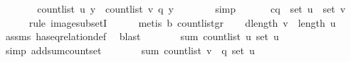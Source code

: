 \begin{isabellebody}
\ \ \ \ \isamarkupfalse%
\ \isamarkupfalse%
\ {\isachardoublequoteopen}count{\isacharunderscore}{\kern0pt}list\ u\ y\ {\isacharequal}{\kern0pt}\ count{\isacharunderscore}{\kern0pt}list\ v\ {\isacharparenleft}{\kern0pt}q\ y{\isacharparenright}{\kern0pt}{\isachardoublequoteclose}\isanewline
\ \ \ \ \ \ \isamarkupfalse%
\ simp\isanewline
\ \ \isamarkupfalse%
\isanewline
\isanewline
\ \ \isamarkupfalse%
\ c{\isacharcolon}{\kern0pt}{\isachardoublequoteopen}q\ {\isacharbackquote}{\kern0pt}\ set\ u\ {\isasymsubseteq}\ set\ v{\isachardoublequoteclose}\ \isanewline
\ \ \ \ \isamarkupfalse%
\ {\isacharparenleft}{\kern0pt}rule\ image{\isacharunderscore}{\kern0pt}subsetI{\isacharparenright}{\kern0pt}\isanewline
\ \ \ \ \isamarkupfalse%
\ {\isacharparenleft}{\kern0pt}metis\ b\ count{\isacharunderscore}{\kern0pt}list{\isacharunderscore}{\kern0pt}gr{\isacharunderscore}{\kern0pt}{}{\isacharparenright}{\kern0pt}\isanewline
\isanewline
\ \ \isamarkupfalse%
\ d{\isacharunderscore}{\kern0pt}{}{\isacharcolon}{\kern0pt}{\isachardoublequoteopen}length\ v\ {\isacharequal}{\kern0pt}\ length\ u{\isachardoublequoteclose}\ \isamarkupfalse%
\ assms\ has{\isacharunderscore}{\kern0pt}eq{\isacharunderscore}{\kern0pt}relation{\isacharunderscore}{\kern0pt}def\ \isamarkupfalse%
\ blast\isanewline
\ \ \isamarkupfalse%
\ \isamarkupfalse%
\ {\isachardoublequoteopen}{\isachardot}{\kern0pt}{\isachardot}{\kern0pt}{\isachardot}{\kern0pt}\ {\isacharequal}{\kern0pt}\ sum\ {\isacharparenleft}{\kern0pt}count{\isacharunderscore}{\kern0pt}list\ u{\isacharparenright}{\kern0pt}\ {\isacharparenleft}{\kern0pt}set\ u{\isacharparenright}{\kern0pt}{\isachardoublequoteclose}\isanewline
\ \ \ \ \isamarkupfalse%
\ {\isacharparenleft}{\kern0pt}simp\ add{\isacharcolon}{\kern0pt}sum{\isacharunderscore}{\kern0pt}count{\isacharunderscore}{\kern0pt}set{\isacharparenright}{\kern0pt}\isanewline
\ \ \isamarkupfalse%
\ \isamarkupfalse%
\ {\isachardoublequoteopen}{\isachardot}{\kern0pt}{\isachardot}{\kern0pt}{\isachardot}{\kern0pt}\ {\isacharequal}{\kern0pt}\ sum\ {\isacharparenleft}{\kern0pt}{\isacharparenleft}{\kern0pt}count{\isacharunderscore}{\kern0pt}list\ v{\isacharparenright}{\kern0pt}\ {\isasymcirc}\ q{\isacharparenright}{\kern0pt}\ {\isacharparenleft}{\kern0pt}set\ u{\isacharparenright}{\kern0pt}{\isachardoublequoteclose}\isanewline
\ \ \ \ \isamarkupfalse%

\end{isabellebody}
